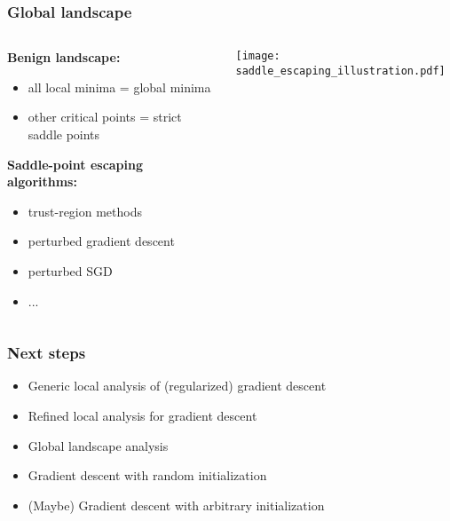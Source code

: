 \documentclass[compress,
mathserif,wide,%
]{beamer}
\begin{document}
\begin{frame}
\frametitle{Global landscape}


\begin{columns}
\begin{column}{0.68\textwidth}
 
{\bf Benign landscape: }
\begin{itemize}
\item all local minima = global minima
\item other critical points = strict saddle points
\end{itemize}
 
 \medskip
 
 {\bf Saddle-point escaping algorithms:}
 
 \begin{itemize}
 \item trust-region methods
 \item perturbed gradient descent
 \item perturbed SGD
 \item ...
 \end{itemize}
 
 \end{column}
 \begin{column}{0.32\textwidth}
 
 \vspace{-0.5in}
 \begin{center}
  \texttt{[image: saddle\_escaping\_illustration.pdf]}
   \end{center}
 
 
 \end{column}
  \end{columns}
  
 
\end{frame}

\begin{frame}
	\frametitle{Next steps}
	\begin{itemize}
		\item Generic local analysis of (regularized) gradient descent
		\item Refined local analysis for gradient descent
		\item Global landscape analysis
		\item Gradient descent with random initialization
		\item (Maybe) Gradient descent with arbitrary initialization 
	\end{itemize}
\end{frame}
\end{document}
